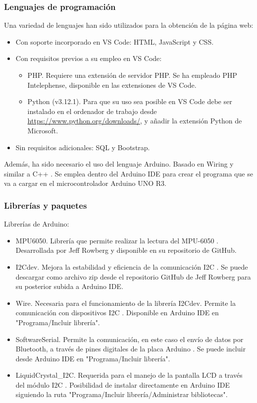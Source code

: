 \begin{itemize}
\end{itemize}


\subsubsection{Lenguajes de programación}
Una variedad de lenguajes han sido utilizados para la obtención de la página web:
\begin{itemize}
    \item Con soporte incorporado en VS Code: HTML, JavaScript y CSS.
    \item Con requisitos previos a su empleo en VS Code:
    \begin{itemize}
        \item PHP. Requiere una extensión de servidor PHP. Se ha empleado PHP Intelephense, disponible en las extensiones de VS Code.
        \item Python (v3.12.1). Para que su uso sea posible en VS Code debe ser instalado en el ordenador de trabajo desde \url{https://www.python.org/downloads/}, y añadir la extensión Python de Microsoft.
    \end{itemize}
    \item Sin requisitos adicionales: SQL y Bootstrap.
\end{itemize}

Además, ha sido necesario el uso del lenguaje Arduino. Basado en Wiring y similar a C++ \cite{Arduino83:online}. Se emplea dentro del Arduino IDE para crear el programa que se va a cargar en el microcontrolador Arduino UNO R3.

\subsubsection{Librerías y paquetes}
Librerías de Arduino:
\begin{itemize}
    \item MPU6050. Librería que permite realizar la lectura del MPU-6050 \cite{MPU605015:online}. Desarrollada por Jeff Rowberg y disponible en su repositorio de GitHub.
    \item I2Cdev. Mejora la estabilidad y eficiencia de la comunicación I2C \cite{MPU605015:online}. Se puede descargar como archivo zip desde el repositorio GitHub de Jeff Rowberg para su posterior subida a Arduino IDE.
    \item Wire. Necesaria para el funcionamiento de la librería I2Cdev. Permite la comunicación con dispositivos I2C \cite{WireArdu98:online}. Disponible en Arduino IDE en "Programa/Incluir librería".
    \item SoftwareSerial. Permite la comunicación, en este caso el envío de datos por Bluetooth, a través de pines digitales de la placa Arduino \cite{Software57:online}. Se puede incluir desde Arduino IDE en "Programa/Incluir librería".
    \item LiquidCrystal\_I2C. Requerida para el manejo de la pantalla LCD a través del módulo I2C \cite{LiquidCr9:online}. Posibilidad de instalar directamente en Arduino IDE siguiendo la ruta "Programa/Incluir librería/Administrar bibliotecas".
\end{itemize}

